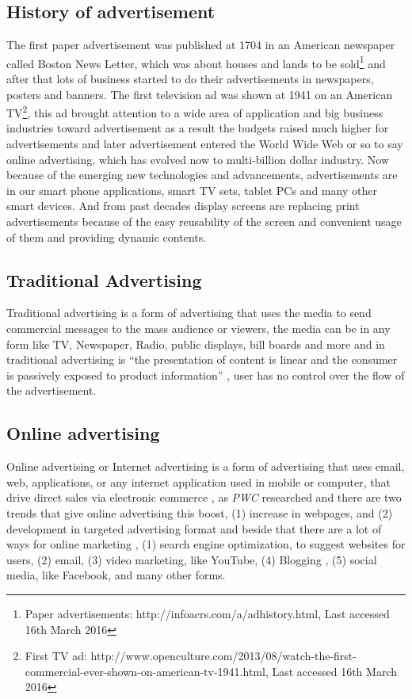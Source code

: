\subsection{History of advertisement}
The first paper advertisement was published at 1704 in an American newspaper called Boston News Letter, which was about houses and lands to be sold\footnote{Paper advertisements: http://infoacrs.com/a/adhistory.html, Last accessed 16th March 2016} and after that lots of business started to do their advertisements in newspapers, posters and banners. The first television ad was shown at 1941 on an American TV\footnote {First TV ad: http://www.openculture.com/2013/08/watch-the-first-commercial-ever-shown-on-american-tv-1941.html, Last accessed 16th March 2016}, this ad brought attention to a wide area of application and big business industries toward advertisement as a result the budgets raised much higher for advertisements and later advertisement entered the World Wide Web or so to say online advertising, which has evolved now to multi-billion dollar industry. Now because of the emerging new technologies and advancements, advertisements are in our smart phone applications, smart TV sets, tablet PCs and many other smart devices. And from past decades display screens are replacing print advertisements because of the easy reusability of the screen and convenient usage of them and providing dynamic contents.


\subsection{Traditional Advertising}
Traditional advertising is a form of advertising that uses the media to send commercial messages to the mass audience or viewers, the media can be in any form like TV, Newspaper, Radio, public displays, bill boards and more and in traditional advertising is “the presentation of content is linear and the consumer is passively exposed to product information” \cite{Non_inter_vs_interAd}, user has no control over the flow of the advertisement. 

\subsection{Online advertising}
Online advertising or Internet advertising is a form of advertising that uses email, web, applications, or any internet application used in mobile or computer, that drive direct sales via electronic commerce \cite{onlinead}, as \emph{PWC}  \cite{pwc} researched and there are two trends that give online advertising this boost, (1) increase in webpages, and (2) development in targeted advertising format and beside that there are a lot of ways for online marketing \cite{waysmarketing}, (1) search engine optimization, to suggest websites for users, (2) email, (3) video marketing, like YouTube, (4) Blogging , (5) social media, like Facebook, and many other forms.

